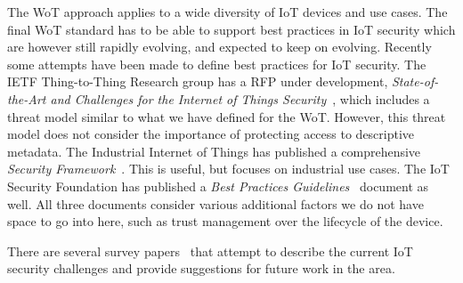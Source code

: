 The WoT approach applies to a wide diversity of IoT devices and use cases.
The final WoT standard has to be able to support best practices in IoT security which
are however still rapidly evolving, and expected to keep on evolving.
Recently some attempts have been made to define
best practices for IoT security.
The IETF Thing-to-Thing Research group has a RFP under development,
\emph{State-of-the-Art and Challenges for the Internet of Things 
Security}~\cite{Garcia2017a}, which includes a threat model similar to 
what we have defined for the WoT.  
However, this threat model does not consider the 
importance of protecting access to descriptive metadata.
The Industrial Internet of Things has published a comprehensive
\emph{Security Framework}~\cite{Iic2016sf}.
This is useful, but focuses on industrial use cases.
The IoT Security Foundation has published
a \textit{Best Practices Guidelines}~\cite{Iotsf2017a}
document as well.
All three documents consider various additional factors we do
not have space to go into here, such as trust management over the 
lifecycle of the device.

There are several survey papers~\cite{Iot2020,Xu2014,Fernandes2017} that attempt to describe 
the current IoT security challenges and provide suggestions for future work in the area.

